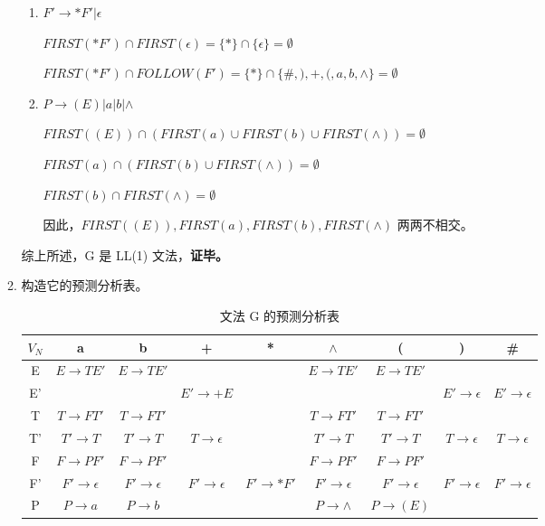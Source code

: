 \begin{enumerate}
\begin{enumerate}
\begin{enumerate}
            \item $F' \to *F' | \epsilon$
            
            $FIRST(*F') \cap FIRST(\epsilon) = \{*\} \cap \{\epsilon\} = \emptyset$
            
            $FIRST(*F') \cap FOLLOW(F') = \{*\} \cap \{\#, ), +, (, a, b, \wedge\} = \emptyset$
            
            \item $P \to (E) | a | b | \wedge$
            
            $FIRST((E)) \cap (FIRST(a) \cup FIRST(b) \cup FIRST(\wedge)) = \emptyset$
            
            $FIRST(a) \cap (FIRST(b) \cup FIRST(\wedge)) = \emptyset$
            
            $FIRST(b) \cap FIRST(\wedge) = \emptyset$
            
            因此，$FIRST((E)), FIRST(a), FIRST(b), FIRST(\wedge)$ 两两不相交。
            
        \end{enumerate}
        
        综上所述，G 是 LL(1) 文法，\textbf{证毕。}
        
        \item 构造它的预测分析表。
        
        \begin{table}[H]
            \centering
            \begin{tabular}{|c|c|c|c|c|c|c|c|c|}
                \hline
                $V_N$ & a & b & + & * & $\wedge$ & ( & ) & \# \\
                \hline
                E & $E \to TE'$ & $E \to TE'$ & & & $E \to TE'$ & $E \to TE'$ & & \\
                \hline
                E' & & & $E' \to +E$ & & & & $E' \to \epsilon$ & $E' \to \epsilon$ \\
                \hline
                T & $T \to FT'$ & $T \to FT'$ & & & $T \to FT'$ & $T \to FT'$ & & \\
                \hline
                T' & $T' \to T$ & $T' \to T$ & $T \to \epsilon$ & & $T' \to T$ & $T' \to T$ & $T \to \epsilon$ & $T \to \epsilon$ \\
                \hline
                F & $F \to PF'$ & $F \to PF'$ & & & $F \to PF'$ & $F \to PF'$ & & \\
                \hline
                F' & $F' \to \epsilon$ & $F' \to \epsilon$ & $F' \to \epsilon$ & $F' \to *F'$ & $F' \to \epsilon$ & $F' \to \epsilon$ & $F' \to \epsilon$ & $F' \to \epsilon$ \\
                \hline
                P & $P \to a$ & $P \to b$ & & & $P \to \wedge$ & $P \to (E)$ & & \\
                \hline
            \end{tabular}
            \caption{文法 G 的预测分析表}
            \label{tab:PA2}
        \end{table}
        

\end{enumerate}
\end{enumerate}
